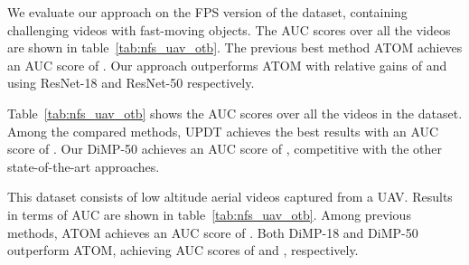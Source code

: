 \documentclass[10pt,twocolumn,letterpaper]{article}
\begin{document}
\begin{table}[!t]
	\centering\vspace{-1mm}
	\vspace{1mm}\caption{State-of-the-art comparison on the NFS, OTB-100 and UAV123 datasets in terms of AUC score.}
	\label{tab:nfs_uav_otb}\vspace{-2mm}
\end{table}

We evaluate our approach on the  FPS version of the dataset, containing challenging videos with fast-moving objects. The AUC scores over all the  videos are shown in table~\ref{tab:nfs_uav_otb}. The previous best method ATOM achieves an AUC score of  . Our approach outperforms ATOM with relative gains of  and  using ResNet-18 and ResNet-50 respectively.

 Table~\ref{tab:nfs_uav_otb} shows the AUC scores over all the  videos in the dataset. Among the compared methods, UPDT achieves the best results with an AUC score of . Our DiMP-50 achieves an AUC score of , competitive with the other state-of-the-art approaches. 

 This dataset consists of  low altitude aerial videos captured from a UAV. Results in terms of AUC are shown in table~\ref{tab:nfs_uav_otb}. Among previous methods, ATOM achieves an AUC score of . Both DiMP-18 and DiMP-50 outperform ATOM, achieving AUC scores of  and , respectively.
\end{document}
